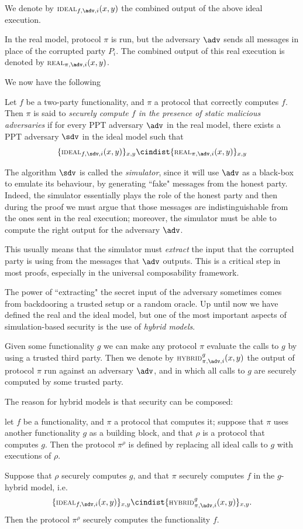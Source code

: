 We denote by $\textsc{\scriptsize IDEAL}_{f,\adv,i}(x,y)$ the combined output of the above ideal execution.

In the real model, protocol $\pi$ is run, but the adversary $\adv$ sends all messages in place of the corrupted party $P_i$. The combined output of this real execution is denoted by $\textsc{\scriptsize REAL}_{\pi,\adv,i}(x,y)$.

We now have the following
\begin{definition}
    Let $f$ be a two-party functionality, and $\pi$ a protocol that correctly computes $f$. Then $\pi$ is said to \emph{securely compute $f$ in the presence of static malicious adversaries} if for every PPT adversary $\adv$ in the real model, there exists a PPT adversary $\sdv$ in the ideal model such that
    $$ \{ \textsc{\scriptsize IDEAL}_{f,\sdv,i}(x,y) \}_{x,y} \cindist \{ \textsc{\scriptsize REAL}_{\pi,\adv,i}(x,y) \}_{x,y}$$
\end{definition}

The algorithm $\sdv$ is called the \emph{simulator}, since it will use $\adv$ as a black-box to emulate its behaviour, by generating ``fake" messages from the honest party. Indeed, the simulator essentially plays the role of the honest party and then during the proof we must argue that those messages are indistinguishable from the ones sent in the real execution; moreover, the simulator must be able to compute the right output for the adversary $\adv$.

This usually means that the simulator must \emph{extract} the input that the corrupted party is using from the messages that $\adv$ outputs. This is a critical step in most proofs, especially in the universal composability framework.

The power of ``extracting" the secret input of the adversary sometimes comes from backdooring a trusted setup or a random oracle. Up until now we have defined the real and the ideal model, but one of the most important aspects of simulation-based security is the use of \emph{hybrid models}.

Given some functionality $g$ we can make any protocol $\pi$ evaluate the calls to $g$ by using a trusted third party. Then we denote by $\textsc{\scriptsize HYBRID}^g_{\pi,\adv,i}(x,y)$ the output of protocol $\pi$ run against an adversary $\adv$, and in which all calls to $g$ are securely computed by some trusted party.

The reason for hybrid models is that security can be composed: 
\begin{theorem}
    let $f$ be a functionality, and $\pi$ a protocol that computes it; suppose that $\pi$ uses another functionality $g$ as a building block, and that $\rho$ is a protocol that computes $g$. Then the protocol $\pi^\rho$ is defined by replacing all ideal calls to $g$ with executions of $\rho$.
    
    Suppose that $\rho$ securely computes $g$, and that $\pi$ securely computes $f$ in the $g$-hybrid model, i.e.
    $$ \{ \textsc{\scriptsize IDEAL}_{f,\sdv,i}(x,y) \}_{x,y} \cindist \{ \textsc{\scriptsize HYBRID}^g_{\pi,\adv,i}(x,y) \}_{x,y}. $$
    Then the protocol $\pi^\rho$ securely computes the functionality $f$.
\end{theorem}

